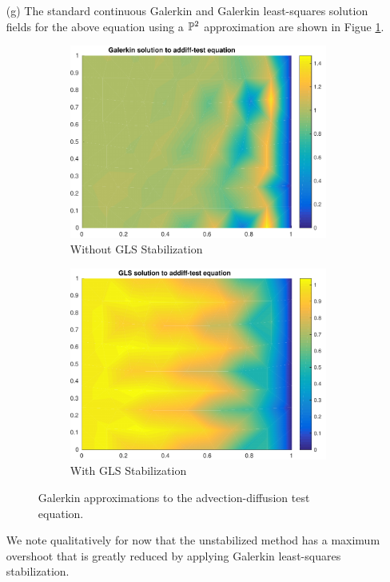 \documentclass{article}
\begin{document}
\begin{itemize}
	\item[(g)]  The standard continuous Galerkin and Galerkin least-squares solution fields for the above equation using a \(\mathbb{P}^2 \) approximation are shown in Figue \ref{fig:addiff-test_solns}.
	\begin{figure}[H]
		\centering
		\begin{subfigure}[b]{0.48\textwidth}
			\includegraphics[width=\textwidth]{addiff-test_soln_Galerkin.pdf}
			\caption{Without GLS Stabilization}
		\end{subfigure}
		\begin{subfigure}[b]{0.48\textwidth}
			\includegraphics[width=\textwidth]{addiff-test_soln_GLS.pdf}
			\caption{With GLS Stabilization}
		\end{subfigure}
		\caption{Galerkin approximations to the advection-diffusion test equation.}
		\label{fig:addiff-test_solns}
	\end{figure}
	We note qualitatively for now that the unstabilized method has a maximum overshoot that is greatly reduced by applying Galerkin least-squares stabilization. \\
	

\end{itemize}
\end{document}
